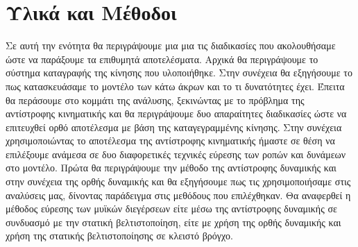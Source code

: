 \chapter{Υλικά και Μέθοδοι}

Σε αυτή την ενότητα θα περιγράψουμε μια μια τις διαδικασίες που ακολουθήσαμε ώστε να παράξουμε τα επιθυμητά αποτελέσματα. Αρχικά θα περιγράψουμε το σύστημα καταγραφής της κίνησης που υλοποιήθηκε. Στην συνέχεια θα εξηγήσουμε το πως κατασκευάσαμε το μοντέλο των κάτω άκρων και το τι δυνατότητες έχει. Έπειτα θα περάσουμε στο κομμάτι της ανάλυσης, ξεκινώντας με το πρόβλημα της αντίστροφης κινηματικής και θα περιγράψουμε δυο απαραίτητες διαδικασίες ώστε να επιτευχθεί ορθό αποτέλεσμα με βάση της καταγεγραμμένης κίνησης. Στην συνέχεια χρησιμοποιώντας το αποτέλεσμα της αντίστροφης κινηματικής ήμαστε σε θέση να επιλέξουμε ανάμεσα σε δυο διαφορετικές τεχνικές εύρεσης των ροπών και δυνάμεων στο μοντέλο. Πρώτα θα περιγράψουμε την μέθοδο της αντίστροφης δυναμικής και στην συνέχεια της ορθής δυναμικής και θα εξηγήσουμε πως τις χρησιμοποιήσαμε στις αναλύσεις μας, δίνοντας παράδειγμα στις μεθόδους που επιλέχθηκαν. Θα αναφερθεί η μέθοδος εύρεσης των μυϊκών διεγέρσεων είτε μέσω της αντίστροφης δυναμικής σε συνδυασμό με την στατική βελτιστοποίηση, είτε με χρήση της ορθής δυναμικής και χρήση της στατικής βελτιστοποίησης σε κλειστό βρόγχο.

%

